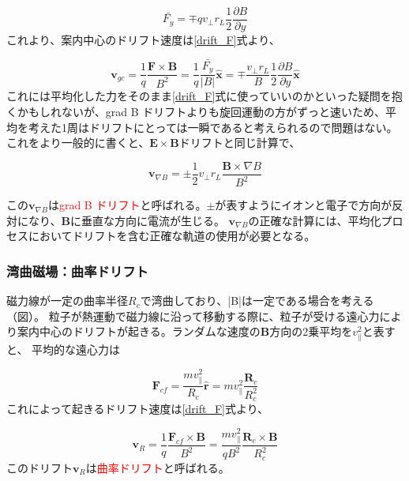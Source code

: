 \documentclass{ltjsarticle}
\numberwithin{equation}{section} %
\begin{document}
\begin{equation}
  \bar{F_y} = \mp q v_\perp r_L \frac{1}{2}\frac{\partial B}{\partial y}
\end{equation}
これより、案内中心のドリフト速度は\eqref{drift_F}式より、

\begin{equation}
  \bm{v}_{gc} = \frac{1}{q}\frac{\bm{F} \times \bm{B}}{B^2} = \frac{1}{q} \frac{\bar{F_y}}{|B|}\hat{\bm{x}} = \mp \frac{v_\perp r_L}{B} \frac{1}{2} \frac{\partial B}{\partial y}\hat{\bm{x}}
\end{equation}
これには平均化した力をそのまま\eqref{drift_F}式に使っていいのかといった疑問を抱くかもしれないが、grad B ドリフトよりも旋回運動の方がずっと速いため、平均を考えた1周はドリフトにとっては一瞬であると考えられるので問題はない。
これをより一般的に書くと、$\bm{E}\times \bm{B}$ドリフトと同じ計算で、

\begin{equation}
  \boxed{\bm{v}_{\nabla B} = \pm \frac{1}{2}v_\perp r_L \frac{\bm{B}\times \nabla B}{B^2}} \label{df.grad_B_drift}
\end{equation}

この$\bm{v}_{\nabla B}$は\textcolor{red}{grad B ドリフト}と呼ばれる。$\pm$が表すようにイオンと電子で方向が反対になり、$\bm{B}$に垂直な方向に電流が生じる。
$\bm{v}_{\nabla B}$の正確な計算には、平均化プロセスにおいてドリフトを含む正確な軌道の使用が必要となる。

\subsubsection{湾曲磁場：曲率ドリフト}
磁力線が一定の曲率半径$R_c$で湾曲しており、|B|は一定である場合を考える（図）。
粒子が熱運動で磁力線に沿って移動する際に、粒子が受ける遠心力により案内中心のドリフトが起きる。ランダムな速度の$\bm{B}$方向の2乗平均を$v_\parallel ^2$と表すと、
平均的な遠心力は

\begin{equation}
  \bm{F}_{cf} = \frac{mv_\parallel ^2}{R_c} \hat{\bm{r}} = mv_\parallel ^2 \frac{\bm{R}_c}{R_c ^2}
\end{equation}
これによって起きるドリフト速度は\eqref{drift_F}式より、

\begin{equation}
  \boxed{\bm{v}_R = \frac{1}{q}\frac{\bm{F}_{cf} \times \bm{B}}{B^2} = \frac{mv_\parallel ^2 }{qB^2} \frac{\bm{R}_c \times \bm{B}}{R_c ^2}}
\end{equation}
このドリフト$\bm{v}_R$は\textcolor{red}{曲率ドリフト}と呼ばれる。
\end{document}
